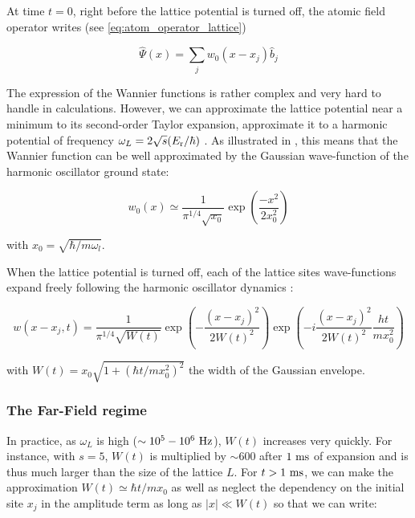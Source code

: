 At time $t=0$, right before the lattice potential is turned off, the atomic field operator writes (see \ref{eq:atom_operator_lattice})

\begin{equation}
    \hat{\Psi}(x)= \sum_{j} w_{0}(x-x_j) \hat{b}_{j} 
    \label{eq:field_operator}
\end{equation}



The expression of the Wannier functions is rather complex and very hard to handle in calculations. However, we can approximate the lattice potential near a minimum to its second-order Taylor expansion, \ie approximate it to a harmonic potential of frequency $\omega_L=2 \sqrt{s} (E_{\rm{r}}/\hbar)$ \cite{toth2008theory}. As illustrated in , this means that the Wannier function can be well approximated by the Gaussian wave-function of the harmonic oscillator ground state:

\begin{equation}
    w_0(x) \simeq \frac{1}{\pi^{1 / 4} \sqrt{x_{0}}} \exp \left(\frac{-x^{2}}{2 x_{0}^{2}}\right)
\end{equation}

\noindent with $x_{0}=\sqrt{\hbar / m \omega_{l}}$.

When the lattice potential is turned off, each of the lattice sites wave-functions expand freely following the harmonic oscillator dynamics \cite{toth2008theory}:

\begin{equation}
    w\left(x-x_{j}, t\right)=\frac{1}{\pi^{1 / 4} \sqrt{W(t)}} \exp \left(-\frac{\left(x-x_{j}\right)^{2}}{2 W(t)^{2}}\right) \exp \left(-i \frac{\left(x-x_{j}\right)^{2}}{2 W(t)^{2}} \frac{h t}{m x_{0}^{2}}\right)
    \label{eq:time_dependent_wannier}
\end{equation}

\noindent with $W(t)=x_{0} \sqrt{1+\left(\hbar t / m x_{0}^{2}\right)^{2}}$ the width of the Gaussian envelope.

\subsubsection{The Far-Field regime}

In practice, as $\omega_L$ is high ($\sim 10^5-10^6 \ \rm{Hz}$), $W(t)$ increases very quickly. For instance, with $s=5$, $W(t)$ is multiplied by $\sim 600$ after $1 \ \rm{ms}$ of expansion and is thus much larger than the size of the lattice $L$. For $t>1 \ \rm{ms}$, we can make the approximation $W(t) \simeq \hbar t/m x_0$ as well as neglect the dependency on the initial site $x_j$ in the amplitude term as long as $|x| \ll W(t)$ so that we can write:

